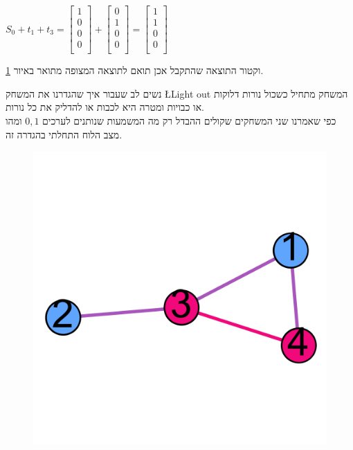 \documentclass[12pt,twoside]{article}
\begin{document}
$
    S_0 + t_1 + t_3 = 
    \begin{bmatrix}
        1 \\
        0 \\
        0 \\
        0 \\
    \end{bmatrix}
    +
    \begin{bmatrix}
        0 \\
        1 \\
        0 \\
        0 \\
    \end{bmatrix}
    =
    \begin{bmatrix}
        1 \\
        1 \\
        0 \\
        0 \\
    \end{bmatrix}
$

וקטור התוצאה שהתקבל אכן תואם לתוצאה המצופה
מתואר באיור 
\ref{fig:start graph presses solution}.

נשים לב שעבור איך שהגדרנו את המשחק 
\L{Light out}
המשחק מתחיל כשכול
נורות דלוקות או כבויות
ומטרה היא לכבות או להדליק את כל נורות.
\\
כפי שאמרנו שני המשחקים שקולים ההבדל רק
מה המשמעות שנותנים לערכים
$0 ,1 $ 
ומהו מצב הלוח התחלתי בהגדרה זה.

\begin{figure}[ht]
    \caption{}
    \label{fig:start graph presses solution}
    \unsethebrew
    \centering
    \includegraphics[width=.7\textwidth,height=.7\textheight,keepaspectratio]{images/graph_presses_solve.png}
\end{figure}
\sethebrew
\end{document}

